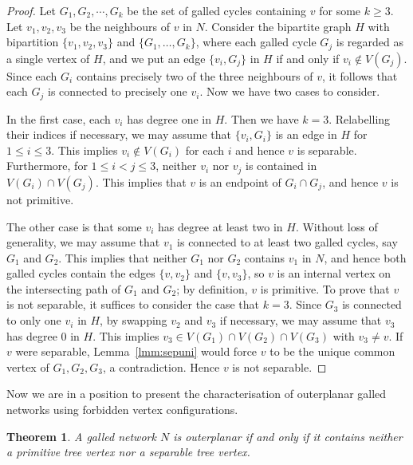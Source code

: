 \documentclass[pdflatex,sn-mathphys-num]{sn-jnl}
\theoremstyle{thmstyleone}%
\newtheorem{theorem}{Theorem}%
\theoremstyle{thmstyletwo}%
\theoremstyle{thmstylethree}%
\begin{document}
\begin{proof}
Let $G_1,G_2,\cdots,G_k$ be the set of galled cycles containing $v$ for some $k\ge 3$. 
Let $v_1,v_2,v_3$ be the neighbours of $v$ in $N$. 
Consider the bipartite graph $H$ with bipartition $\{v_1,v_2,v_3\}$ and $\{G_1,\dots,G_k\}$, where each galled cycle $G_j$ is regarded as a single vertex of $H$, and we put an edge $\{v_i,G_j\}$ in $H$ if and only if $v_i\notin V(G_j)$.
Since each $G_i$ contains precisely two of the three neighbours of $v$, it follows that each $G_j$ is connected to precisely one $v_i$. Now we have two cases to consider. 

In the first case, each $v_i$ has degree one in $H$.  Then we have $k=3$. Relabelling their indices if necessary, we may assume that $\{v_i,G_i\}$ is an edge in $H$ for $1\le i \le 3$. This implies $v_i\not \in V(G_i)$ for each $i$ and hence $v$ is separable.
Furthermore, for $1\le i <j\le 3$, neither $v_i$ nor $v_j$ is contained in $V(G_i)\cap V(G_j)$. This implies that $v$ is an endpoint of $G_i\cap G_j$, and hence $v$ is not primitive.

The other case is that some $v_i$ has degree at least two in $H$. Without loss of generality, we may assume that $v_1$ is connected to at least two galled cycles, say $G_1$ and $G_2$. This implies that neither $G_1$ nor $G_2$ contains $v_1$ in $N$, and hence both galled cycles contain the edges $\{v,v_2\}$ and $\{v,v_3\}$, so $v$ is an internal vertex on the intersecting path of $G_1$ and $G_2$; by definition, $v$ is primitive. 
To prove that $v$ is not separable, it suffices to consider the case that $k=3$. Since $G_3$ is connected to only one $v_i$ in $H$, by swapping $v_2$ and $v_3$ if necessary, we may assume that $v_3$ has  degree $0$ in $H$. This implies $v_3\in V(G_1)\cap V(G_2)\cap V(G_3)$ with $v_3\ne v$.
If $v$ were separable, Lemma~\ref{lmm:sepuni} would force $v$ to be the unique common vertex of $G_1,G_2,G_3$, a contradiction. Hence $v$ is not separable.
\end{proof}


Now we are in a position to present the  characterisation of outerplanar galled networks using forbidden vertex configurations.

\begin{theorem}\label{thm:outerplanar-forbidden}
A galled network $N$ is outerplanar if and only if it contains neither a  primitive tree vertex nor a separable tree vertex.
\end{theorem}
\end{document}
